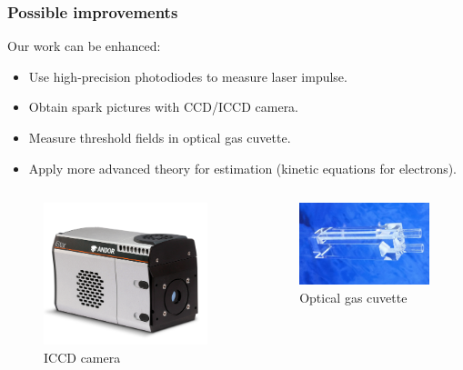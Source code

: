 \documentclass{beamer}
\begin{document}
	\begin{frame}
		\frametitle{Possible improvements}
		Our work can be enhanced:
		\begin{itemize}
			\item Use high-precision photodiodes to measure laser impulse.
			\item Obtain spark pictures with CCD/ICCD camera.
			\item Measure threshold fields in optical gas cuvette.
			\item Apply more advanced theory for estimation (kinetic equations for electrons).
		\end{itemize}
	
		\begin{columns}
			\begin{figure}
				\centering
				\includegraphics[width=0.9\linewidth]{res/iccd_camera.png}
				\caption*{ICCD camera}
			\end{figure}
			\begin{figure}
				\centering
				\includegraphics[width=0.9\linewidth]{res/gas_cuvette.jpeg}
				\caption*{Optical gas cuvette}
			\end{figure}
		\end{columns}
	
		
	\end{frame}
	
\end{document}
